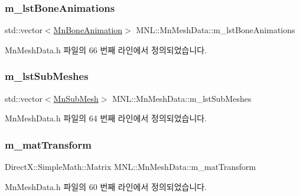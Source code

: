 \subsubsection{\texorpdfstring{m\+\_\+lst\+Bone\+Animations}{m\_lstBoneAnimations}}
{\footnotesize\ttfamily std\+::vector$<$\hyperlink{class_m_n_l_1_1_mn_bone_animation}{Mn\+Bone\+Animation}$>$ M\+N\+L\+::\+Mn\+Mesh\+Data\+::m\+\_\+lst\+Bone\+Animations\hspace{0.3cm}{\ttfamily [private]}}



Mn\+Mesh\+Data.\+h 파일의 66 번째 라인에서 정의되었습니다.

\mbox{\label{class_m_n_l_1_1_mn_mesh_data_ad81b9296d62dcd2d53206f58654b581d}} 
\subsubsection{\texorpdfstring{m\+\_\+lst\+Sub\+Meshes}{m\_lstSubMeshes}}
{\footnotesize\ttfamily std\+::vector$<$\hyperlink{struct_m_n_l_1_1_mn_sub_mesh}{Mn\+Sub\+Mesh}$>$ M\+N\+L\+::\+Mn\+Mesh\+Data\+::m\+\_\+lst\+Sub\+Meshes\hspace{0.3cm}{\ttfamily [private]}}



Mn\+Mesh\+Data.\+h 파일의 64 번째 라인에서 정의되었습니다.

\mbox{\label{class_m_n_l_1_1_mn_mesh_data_a32634c82d36b16309ccd823aad588b9f}} 
\subsubsection{\texorpdfstring{m\+\_\+mat\+Transform}{m\_matTransform}}
{\footnotesize\ttfamily Direct\+X\+::\+Simple\+Math\+::\+Matrix M\+N\+L\+::\+Mn\+Mesh\+Data\+::m\+\_\+mat\+Transform\hspace{0.3cm}{\ttfamily [private]}}



Mn\+Mesh\+Data.\+h 파일의 60 번째 라인에서 정의되었습니다.


